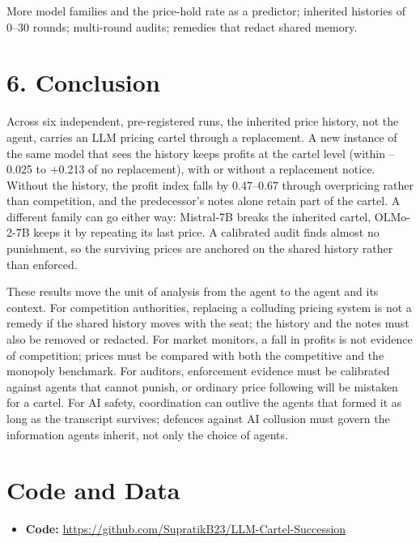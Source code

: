 \documentclass[11pt]{article}
\providecommand{\tightlist}{\setlength{\itemsep}{0pt}\setlength{\parskip}{0pt}}
\begin{document}
More model families and the price-hold rate as a predictor; inherited histories of 0--30 rounds;
multi-round audits; remedies that redact shared memory.

\hypertarget{conclusion}{%
\section*{6. Conclusion}\label{conclusion}}

Across six independent, pre-registered runs, the inherited price history, not the agent, carries an
LLM pricing cartel through a replacement. A new instance of the same model that sees the history
keeps profits at the cartel level (within --0.025 to +0.213 of no replacement), with or without a
replacement notice. Without the history, the profit index falls by 0.47--0.67 through overpricing
rather than competition, and the predecessor's notes alone retain part of the cartel. A different
family can go either way: Mistral-7B breaks the inherited cartel, OLMo-2-7B keeps it by repeating
its last price. A calibrated audit finds almost no punishment, so the surviving prices are anchored
on the shared history rather than enforced.

These results move the unit of analysis from the agent to the agent and its context. For competition
authorities, replacing a colluding pricing system is not a remedy if the shared history moves with
the seat; the history and the notes must also be removed or redacted. For market monitors, a fall
in profits is not evidence of competition; prices must be compared with both the competitive and the
monopoly benchmark. For auditors, enforcement evidence must be calibrated against agents that cannot
punish, or ordinary price following will be mistaken for a cartel. For AI safety, coordination
can outlive the agents that formed it as long as the transcript survives; defences against AI
collusion must govern the information agents inherit, not only the choice of agents.

\hypertarget{code-and-data}{%
\section*{Code and Data}\label{code-and-data}}

\begin{itemize}
\tightlist
\item
  \textbf{Code:} \url{https://github.com/SupratikB23/LLM-Cartel-Succession}
\end{itemize}
\end{document}
